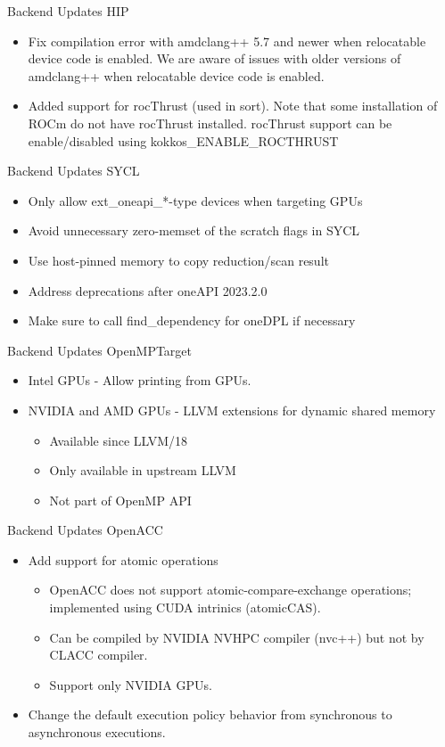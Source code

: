 \begin{frame}[fragile]{Backend Updates HIP}
\begin{itemize}
\item Fix compilation error with amdclang++ 5.7 and newer when
  relocatable device code is enabled. We are aware of issues with older
  versions of amdclang++ when relocatable device code is enabled.
\item Added support for rocThrust (used in sort). Note that some
  installation of ROCm do not have rocThrust installed. rocThrust support
  can be enable/disabled using kokkos\_ENABLE\_ROCTHRUST
\end{itemize}
\end{frame}

\begin{frame}[fragile]{Backend Updates SYCL}
\begin{itemize}
\item Only allow ext\_oneapi\_*-type devices when targeting GPUs
\item Avoid unnecessary zero-memset of the scratch flags in SYCL
\item Use host-pinned memory to copy reduction/scan result
\item Address deprecations after oneAPI 2023.2.0 
\item Make sure to call find\_dependency for oneDPL if necessary
\end{itemize}
\end{frame}

\begin{frame}[fragile]{Backend Updates OpenMPTarget}
\begin{itemize}
\item Intel GPUs - Allow printing from GPUs.
\item NVIDIA and AMD GPUs - LLVM extensions for dynamic shared memory
\begin{itemize}
    \item Available since LLVM/18
    \item Only available in upstream LLVM 
    \item Not part of OpenMP API
\end{itemize}
\end{itemize}
\end{frame}

\begin{frame}[fragile]{Backend Updates OpenACC}
\begin{itemize}
\item Add support for atomic operations
\begin{itemize}
    \item OpenACC does not support atomic-compare-exchange operations; implemented using CUDA intrinics (atomicCAS).
    \item Can be compiled by NVIDIA NVHPC compiler (nvc++) but not by CLACC compiler.
    \item Support only NVIDIA GPUs.
\end{itemize}
\item Change the default execution policy behavior from synchronous to asynchronous executions.
\end{itemize}
\end{frame}



